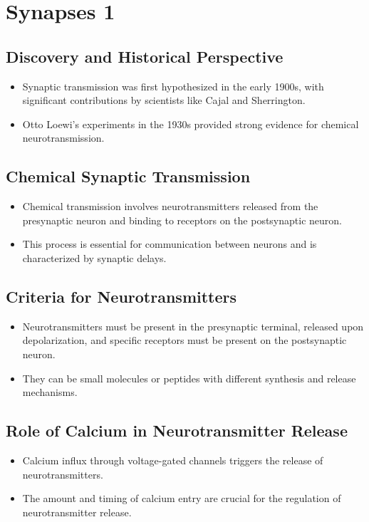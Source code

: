 \documentclass{article}
\begin{document}
\section{Synapses 1}

\subsection{Discovery and Historical Perspective}
\begin{itemize}
    \item Synaptic transmission was first hypothesized in the early 1900s, with significant contributions by scientists like Cajal and Sherrington.
    \item Otto Loewi's experiments in the 1930s provided strong evidence for chemical neurotransmission.
\end{itemize}

\subsection{Chemical Synaptic Transmission}
\begin{itemize}
    \item Chemical transmission involves neurotransmitters released from the presynaptic neuron and binding to receptors on the postsynaptic neuron.
    \item This process is essential for communication between neurons and is characterized by synaptic delays.
\end{itemize}

\subsection{Criteria for Neurotransmitters}
\begin{itemize}
    \item Neurotransmitters must be present in the presynaptic terminal, released upon depolarization, and specific receptors must be present on the postsynaptic neuron.
    \item They can be small molecules or peptides with different synthesis and release mechanisms.
\end{itemize}

\subsection{Role of Calcium in Neurotransmitter Release}
\begin{itemize}
    \item Calcium influx through voltage-gated channels triggers the release of neurotransmitters.
    \item The amount and timing of calcium entry are crucial for the regulation of neurotransmitter release.
\end{itemize}
\end{document}
